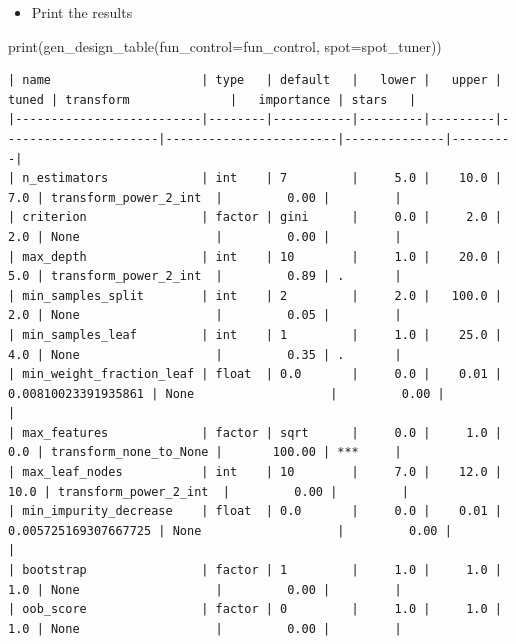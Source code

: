 \documentclass[
  letterpaper,
  DIV=11,
  numbers=noendperiod]{scrreprt}
\newenvironment{Shaded}{\begin{snugshade}}{\end{snugshade}}
\newcommand{\BuiltInTok}[1]{\textcolor[rgb]{0.00,0.23,0.31}{#1}}
\newcommand{\NormalTok}[1]{\textcolor[rgb]{0.00,0.23,0.31}{#1}}
\newcommand{\OperatorTok}[1]{\textcolor[rgb]{0.37,0.37,0.37}{#1}}
\providecommand{\tightlist}{%
  \setlength{\itemsep}{0pt}\setlength{\parskip}{0pt}}\usepackage{longtable,booktabs,array}
\begin{document}
\begin{itemize}
\tightlist
\item
  Print the results
\end{itemize}

\begin{Shaded}
\begin{Highlighting}[]
\BuiltInTok{print}\NormalTok{(gen\_design\_table(fun\_control}\OperatorTok{=}\NormalTok{fun\_control,}
\NormalTok{    spot}\OperatorTok{=}\NormalTok{spot\_tuner))}
\end{Highlighting}
\end{Shaded}

\begin{verbatim}
| name                     | type   | default   |   lower |   upper |                tuned | transform              |   importance | stars   |
|--------------------------|--------|-----------|---------|---------|----------------------|------------------------|--------------|---------|
| n_estimators             | int    | 7         |     5.0 |    10.0 |                  7.0 | transform_power_2_int  |         0.00 |         |
| criterion                | factor | gini      |     0.0 |     2.0 |                  2.0 | None                   |         0.00 |         |
| max_depth                | int    | 10        |     1.0 |    20.0 |                  5.0 | transform_power_2_int  |         0.89 | .       |
| min_samples_split        | int    | 2         |     2.0 |   100.0 |                  2.0 | None                   |         0.05 |         |
| min_samples_leaf         | int    | 1         |     1.0 |    25.0 |                  4.0 | None                   |         0.35 | .       |
| min_weight_fraction_leaf | float  | 0.0       |     0.0 |    0.01 |  0.00810023391935861 | None                   |         0.00 |         |
| max_features             | factor | sqrt      |     0.0 |     1.0 |                  0.0 | transform_none_to_None |       100.00 | ***     |
| max_leaf_nodes           | int    | 10        |     7.0 |    12.0 |                 10.0 | transform_power_2_int  |         0.00 |         |
| min_impurity_decrease    | float  | 0.0       |     0.0 |    0.01 | 0.005725169307667725 | None                   |         0.00 |         |
| bootstrap                | factor | 1         |     1.0 |     1.0 |                  1.0 | None                   |         0.00 |         |
| oob_score                | factor | 0         |     1.0 |     1.0 |                  1.0 | None                   |         0.00 |         |
\end{verbatim}
\end{document}
